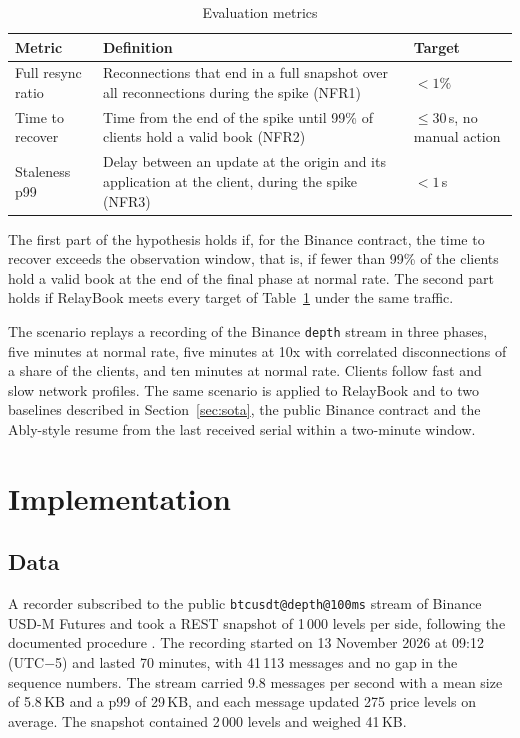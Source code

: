 \documentclass[conference]{IEEEtran}
\begin{document}
\begin{table}[t]
\caption{Evaluation metrics}
\label{tab:metrics}
\centering
\footnotesize
\begin{tabular}{p{1.6cm}p{3.6cm}p{1.6cm}}
\toprule
Metric & Definition & Target \\
\midrule
Full resync ratio & Reconnections that end in a full snapshot over all reconnections during the spike (NFR1) & $< 1\%$ \\
Time to recover & Time from the end of the spike until 99\% of clients hold a valid book (NFR2) & $\leq 30$\,s, no manual action \\
Staleness p99 & Delay between an update at the origin and its application at the client, during the spike (NFR3) & $< 1$\,s \\
\bottomrule
\end{tabular}
\end{table}

The first part of the hypothesis holds if, for the Binance contract, the time to recover exceeds the observation window, that is, if fewer than 99\% of the clients hold a valid book at the end of the final phase at normal rate. The second part holds if RelayBook meets every target of Table~\ref{tab:metrics} under the same traffic.

The scenario replays a recording of the Binance \texttt{depth} stream in three phases, five minutes at normal rate, five minutes at 10x with correlated disconnections of a share of the clients, and ten minutes at normal rate. Clients follow fast and slow network profiles. The same scenario is applied to RelayBook and to two baselines described in Section~\ref{sec:sota}, the public Binance contract and the Ably-style resume from the last received serial within a two-minute window.

\section{Implementation}

\subsection{Data}

A recorder subscribed to the public \texttt{btcusdt@depth@100ms} stream of Binance USD-M Futures and took a REST snapshot of 1\,000 levels per side, following the documented procedure \cite{binance-localbook}. The recording started on 13 November 2026 at 09:12 (UTC$-$5) and lasted 70 minutes, with 41\,113 messages and no gap in the sequence numbers. The stream carried 9.8 messages per second with a mean size of 5.8\,KB and a p99 of 29\,KB, and each message updated 275 price levels on average. The snapshot contained 2\,000 levels and weighed 41\,KB.
\end{document}
